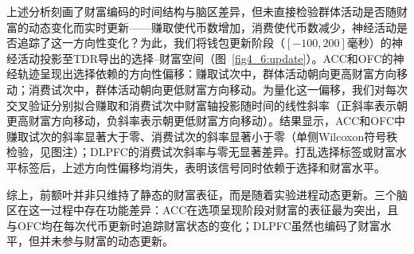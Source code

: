 上述分析刻画了财富编码的时间结构与脑区差异，但未直接检验群体活动是否随财富的动态变化而实时更新——赚取使代币数增加，消费使代币数减少，神经活动是否追踪了这一方向性变化？为此，我们将钱包更新阶段（$[-100,200]$毫秒）的神经活动投影至TDR导出的选择–财富空间（图~\ref{fig4_6:update}）。ACC和OFC的神经轨迹呈现出选择依赖的方向性偏移：赚取试次中，群体活动朝向更高财富方向移动；消费试次中，群体活动朝向更低财富方向移动。为量化这一偏移，我们对每次交叉验证分别拟合赚取和消费试次中财富轴投影随时间的线性斜率（正斜率表示朝更高财富方向移动，负斜率表示朝更低财富方向移动）。结果显示，ACC和OFC中赚取试次的斜率显著大于零、消费试次的斜率显著小于零（单侧Wilcoxon符号秩检验，见图注）；DLPFC的消费试次斜率与零无显著差异。打乱选择标签或财富水平标签后，上述方向性偏移均消失，表明该信号同时依赖于选择和财富水平。

综上，前额叶并非只维持了静态的财富表征，而是随着实验进程动态更新。三个脑区在这一过程中存在功能差异：ACC在选项呈现阶段对财富的表征最为突出，且与OFC均在每次代币更新时追踪财富状态的变化；DLPFC虽然也编码了财富水平，但并未参与财富的动态更新。